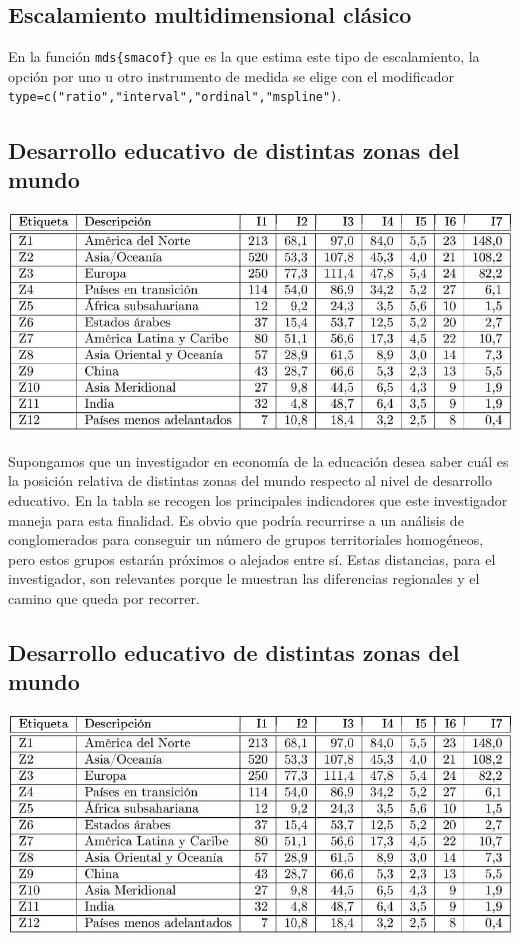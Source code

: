 \documentclass[]{article}
\begin{document}
\subsection{Escalamiento multidimensional
clásico}\label{escalamiento-multidimensional-cluxe1sico-1}

 En la función \texttt{mds\{smacof\}} que es la que estima este tipo de
escalamiento, la opción por uno u otro instrumento de medida se elige
con el modificador
\texttt{type=c("ratio","interval","ordinal","mspline")}.

\subsection{Desarrollo educativo de distintas zonas del
mundo}\label{desarrollo-educativo-de-distintas-zonas-del-mundo}

\hypertarget{left}{}
\includegraphics[width=1\linewidth]{images/cuadro}

\hypertarget{right}{}
Supongamos que un investigador en economía de la educación desea saber
cuál es la posición relativa de distintas zonas del mundo respecto al
nivel de desarrollo educativo. En la tabla se recogen los principales
indicadores que este investigador maneja para esta finalidad. Es obvio
que podría recurrirse a un análisis de conglomerados para conseguir un
número de grupos territoriales homogéneos, pero estos grupos estarán
próximos o alejados entre sí. Estas distancias, para el investigador,
son relevantes porque le muestran las diferencias regionales y el camino
que queda por recorrer.

\subsection{Desarrollo educativo de distintas zonas del
mundo}\label{desarrollo-educativo-de-distintas-zonas-del-mundo-1}

\hypertarget{left}{}
\includegraphics[width=1\linewidth]{images/cuadro}
\end{document}
